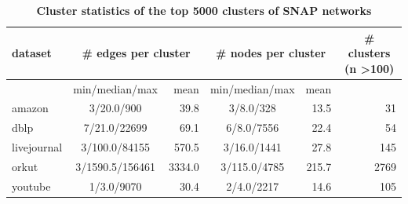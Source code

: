\documentclass[aps,pre,superscriptaddress]{article}
\begin{document}
\begin{table}[!htpb]
	\caption{\textbf{Cluster statistics of the top 5000 clusters of SNAP networks}}
	\begin{tabular}{lcrcrr}
		\hline
		dataset     & \multicolumn{2}{c}{\# edges per cluster} & \multicolumn{2}{c}{\# nodes per cluster} & \multicolumn{1}{c}{\# clusters (n \textgreater 100)}                                \\
		\hline

		            & min/median/max                           & mean                                     & min/median/max                                       & mean  & \multicolumn{1}{l}{} \\
		\hline
		\hline
		amazon      & 3/20.0/900                               & 39.8                                     & 3/8.0/328                                            & 13.5  & 31                   \\
		dblp        & 7/21.0/22699                             & 69.1                                     & 6/8.0/7556                                           & 22.4  & 54                   \\
		livejournal & 3/100.0/84155                            & 570.5                                    & 3/16.0/1441                                          & 27.8  & 145                  \\
		orkut       & 3/1590.5/156461                          & 3334.0                                   & 3/115.0/4785                                         & 215.7 & 2769                 \\
		youtube     & 1/3.0/9070                               & 30.4                                     & 2/4.0/2217                                           & 14.6  & 105                  \\
		\hline
	\end{tabular}
\end{table}
\end{document}
